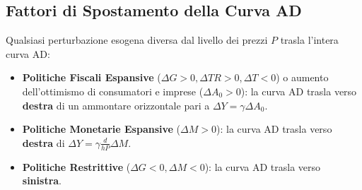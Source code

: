\subsection{Fattori di Spostamento della Curva AD}
Qualsiasi perturbazione esogena diversa dal livello dei prezzi $P$ trasla l'intera curva AD:
\begin{itemize}
    \item \textbf{Politiche Fiscali Espansive} ($\Delta G > 0, \Delta TR > 0, \Delta T < 0$) o aumento dell'ottimismo di consumatori e imprese ($\Delta A_0 > 0$): la curva AD trasla verso \textbf{destra} di un ammontare orizzontale pari a $\Delta Y = \gamma \Delta A_0$.
    \item \textbf{Politiche Monetarie Espansive} ($\Delta M > 0$): la curva AD trasla verso \textbf{destra} di $\Delta Y = \gamma \frac{d}{h P}\Delta M$.
    \item \textbf{Politiche Restrittive} ($\Delta G < 0, \Delta M < 0$): la curva AD trasla verso \textbf{sinistra}.
\end{itemize}

